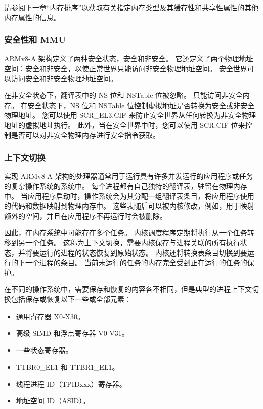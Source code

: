 
请参阅下一章“内存排序”以获取有关指定内存类型及其缓存性和共享性属性的其他内存属性的信息。

\subsubsection{安全性和 MMU}

ARMv8-A 架构定义了两种安全状态，安全和非安全。
它还定义了两个物理地址空间：安全和非安全，以使正常世界只能访问非安全物理地址空间。
安全世界可以访问安全和非安全物理地址空间。

在非安全状态下，翻译表中的 NS 位和 NSTable 位被忽略。
只能访问非安全内存。
在安全状态下，NS 位和 NSTable 位控制虚拟地址是否转换为安全或非安全物理地址。
您可以使用 SCR\_EL3.CIF 来防止安全世界从任何转换为非安全物理地址的虚拟地址执行。
此外，当在安全世界中时，您可以使用 SCR.CIF 位来控制是否可以对非安全物理内存进行安全指令获取。

\subsubsection{上下文切换}

实现 ARMv8-A 架构的处理器通常用于运行具有许多并发运行的应用程序或任务的复杂操作系统的系统中。
每个进程都有自己独特的翻译表，驻留在物理内存中。
当应用程序启动时，操作系统会为其分配一组翻译表条目，将应用程序使用的代码和数据映射到物理内存中。
这些表随后可以被内核修改，例如，用于映射额外的空间，并且在应用程序不再运行时会被删除。

因此，在内存系统中可能存在多个任务。
内核调度程序定期将执行从一个任务转移到另一个任务。
这称为上下文切换，需要内核保存与进程关联的所有执行状态，并将要运行的进程的状态恢复到原始状态。
内核还将转换表条目切换到要运行的下一个进程的条目。
当前未运行的任务的内存完全受到正在运行的任务的保护。

在不同的操作系统中，需要保存和恢复的内容各不相同，但是典型的进程上下文切换包括保存或恢复以下一些或全部元素：

\begin{itemize}
  \item 通用寄存器 X0-X30。
  \item 高级 SIMD 和浮点寄存器 V0-V31。
  \item 一些状态寄存器。
  \item TTBR0\_EL1 和 TTBR1\_EL1。
  \item 线程进程 ID（TPIDxxx）寄存器。
  \item 地址空间 ID（ASID）。
\end{itemize}

